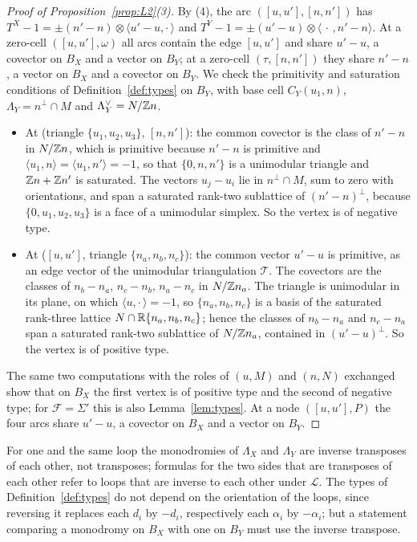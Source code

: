 \begin{proof}[Proof of Proposition~\ref{prop:L2}(3)]
By (4), the arc $([u,u'],[n,n'])$ has $T^X-1=\pm(n'-n)\otimes\langle u'-u,\cdot\,\rangle$ and $T^Y-1=\pm(u'-u)\otimes
\langle\,\cdot\,,n'-n\rangle$. At a zero-cell $([u,u'],\omega)$ all arcs contain the edge $[u,u']$ and share $u'-u$, a
covector on $B_X$ and a vector on $B_Y$; at a zero-cell $(\tau,[n,n'])$ they share $n'-n$, a vector on $B_X$ and a covector
on $B_Y$. We check the primitivity and saturation conditions of Definition~\ref{def:types} on $B_Y$, with base cell
$C_Y(u_1,n)$, $\Lambda_Y=n^\perp\cap M$ and $\Lambda_Y^\vee=N/\mathbb Z n$.
\begin{itemize}
\item At (triangle $\{u_1,u_2,u_3\}$, $[n,n']$): the common covector is the class of $n'-n$ in $N/\mathbb Z n$, which is primitive
because $n'-n$ is primitive and $\langle u_1,n\rangle=\langle u_1,n'\rangle=-1$, so that $\{0,n,n'\}$ is a unimodular
triangle and $\mathbb Z n+\mathbb Z n'$ is saturated. The vectors $u_j-u_i$ lie in $n^\perp\cap M$, sum to zero with orientations, and
span a saturated rank-two sublattice of $(n'-n)^\perp$, because $\{0,u_1,u_2,u_3\}$ is a face of a unimodular simplex. So
the vertex is of negative type.
\item At ($[u,u']$, triangle $\{n_a,n_b,n_c\}$): the common vector $u'-u$ is primitive, as an edge vector of the unimodular
triangulation $\mathcal T$. The covectors are the classes of $n_b-n_a$, $n_c-n_b$, $n_a-n_c$ in $N/\mathbb Z n_a$. The triangle
is unimodular in its plane, on which $\langle u,\cdot\,\rangle=-1$, so $\{n_a,n_b,n_c\}$ is a basis of the saturated
rank-three lattice $N\cap\mathbb R\{n_a,n_b,n_c\}$; hence the classes of $n_b-n_a$ and $n_c-n_a$ span a saturated rank-two
sublattice of $N/\mathbb Z n_a$, contained in $(u'-u)^\perp$. So the vertex is of positive type.
\end{itemize}
The same two computations with the roles of $(u,M)$ and $(n,N)$ exchanged show that on $B_X$ the first vertex is of
positive type and the second of negative type; for $\mathcal F=\Sigma'$ this is also Lemma~\ref{lem:types}. At a node
$([u,u'],P)$ the four arcs share $u'-u$, a covector on $B_X$ and a vector on $B_Y$.
\end{proof}

\begin{remark}\label{rem:sameloop}
For one and the same loop the monodromies of $\Lambda_X$ and $\Lambda_Y$ are inverse transposes of each other, not
transposes; formulas for the two sides that are transposes of each other refer to loops that are inverse to each other
under $\mathcal L$. The types of Definition~\ref{def:types} do not depend on the orientation of the loops, since reversing
it replaces each $d_i$ by $-d_i$, respectively each $\alpha_i$ by $-\alpha_i$; but a statement comparing a monodromy on
$B_X$ with one on $B_Y$ must use the inverse transpose.
\end{remark}
